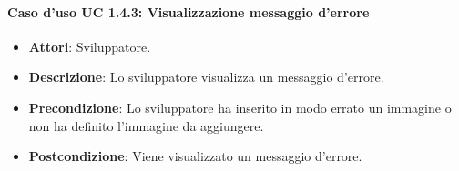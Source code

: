\paragraph{Caso d'uso UC 1.4.3: Visualizzazione messaggio d'errore}

\FloatBarrier
\begin{itemize}
\item\textbf{Attori}: Sviluppatore.
\item\textbf{Descrizione}: Lo sviluppatore visualizza un messaggio d'errore.
\item\textbf{Precondizione}: Lo sviluppatore ha inserito in modo errato un immagine o non ha definito l'immagine da aggiungere.
\item\textbf{Postcondizione}: Viene visualizzato un messaggio d'errore.
\end{itemize}
